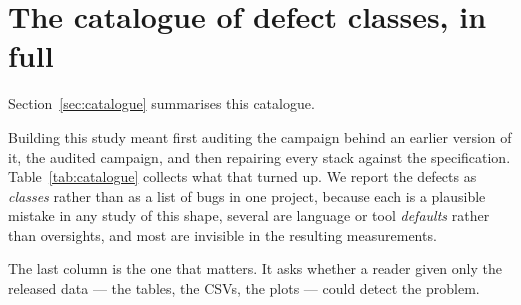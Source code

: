 \section{The catalogue of defect classes, in full}
\label{app:catalogue}

Section~\ref{sec:catalogue} summarises this catalogue.

Building this study meant first auditing the campaign behind an earlier
version of it, the audited campaign,
and then repairing every stack against the specification. Table~\ref{tab:catalogue}
collects what that turned up. We report the defects as \emph{classes} rather
than as a list of bugs in one project, because each is a plausible mistake in
any study of this shape, several are language or tool \emph{defaults} rather
than oversights, and most are invisible in the resulting measurements.

The last column is the one that matters. It asks whether a reader given only the
released data --- the tables, the CSVs, the plots --- could detect the problem.

